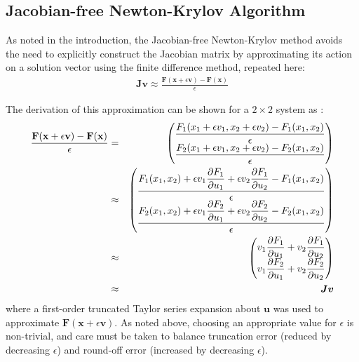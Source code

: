 \documentclass[sn-mathphys,Numbered]{sn-jnl}%
\newcommand{\bb}{\boldsymbol}
\begin{document}
\subsection{Jacobian-free Newton-Krylov Algorithm}
\label{sec:JFNK_alg}


As noted in the introduction, the Jacobian-free Newton-Krylov method avoids the need to explicitly construct the Jacobian matrix by approximating its action on a solution vector using the finite difference method, repeated here:
\begin{eqnarray} \label{eq:JF}
	\bb{J} \bb{v} \approx \frac{\bb{F}(\bb{x} + \epsilon \bb{v}) - \bb{F}(\bb{x})}{\epsilon}
\end{eqnarray}

The derivation of this approximation can be shown for a $2 \times 2$ system as \cite{Knoll2004}:
\begin{eqnarray}
	\frac{\mathbf{F}(\mathbf{x} + \epsilon \mathbf{v}) - \mathbf{F}(\mathbf{x})}{\epsilon}
	&=&
	\begin{pmatrix}
	\dfrac{F_1 (x_1 + \epsilon v_1, x_2 + \epsilon v_2) - F_1 (x_1, x_2)}{\epsilon}\\
	\dfrac{F_2 (x_1 + \epsilon v_1, x_2 + \epsilon v_2) - F_2 (x_1, x_2)}{\epsilon}
	\end{pmatrix} \notag \\
	&\approx&
	\begin{pmatrix}
	\dfrac{F_1 (x_1,x_2) + \epsilon v_1 \dfrac{\partial F_1}{\partial u_1} + \epsilon v_2 \dfrac{\partial F_1}{\partial u_2} - F_1 (x_1, x_2)}{\epsilon}\\
	\dfrac{F_2 (x_1, x_2) + \epsilon v_1 \dfrac{\partial F_2}{\partial u_1} + \epsilon v_2 \dfrac{\partial F_2}{\partial u_2}  - F_2 (x_1, x_2)}{\epsilon}
	\end{pmatrix} \notag \\
	&\approx&
	\begin{pmatrix}
	v_1 \dfrac{\partial F_1}{\partial u_1} +  v_2 \dfrac{\partial F_1}{\partial u_2} \\
	v_1 \dfrac{\partial F_2}{\partial u_1} + v_2 \dfrac{\partial F_2}{\partial u_2}
	\end{pmatrix} \notag \\
	&\approx&
	\bb{J} \bb{v}
\end{eqnarray}
where a first-order truncated Taylor series expansion about $\bb{u}$ was used to approximate $\bb{F} (\bb{x} + \epsilon \bb{v})$.
As noted above, choosing an appropriate value for $\epsilon$ is non-trivial, and care must be taken to balance truncation error (reduced by decreasing $\epsilon$) and round-off error (increased by decreasing $\epsilon$).
\end{document}
